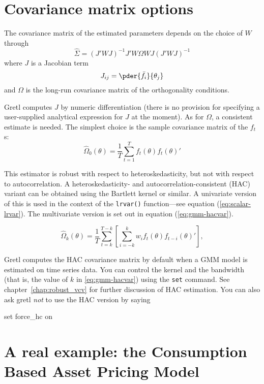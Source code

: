 \section{Covariance matrix options}
\label{sec:gmm-vcv}

The covariance matrix of the estimated parameters depends on the
choice of $W$ through
\begin{equation}
  \label{eq:gmmest-vcv}
    \hat{\Sigma} = (J'WJ)^{-1} J'W\Omega W J (J'WJ)^{-1}
\end{equation}
where $J$ is a Jacobian term
\[
  J_{ij} = \pder{\bar{f}_i}{\theta_j}
\]
and $\Omega$ is the long-run covariance matrix of the orthogonality
conditions. 

Gretl computes $J$ by numeric differentiation (there is no
provision for specifying a user-supplied analytical expression for $J$
at the moment). As for $\Omega$, a consistent estimate is needed. The
simplest choice is the sample covariance matrix of the $f_t$s:
\begin{equation}
  \label{eq:gmm-hcvar}
    \hat{\Omega}_0(\theta) = \frac{1}{T} \sum_{t=1}^T f_t(\theta) f_t(\theta)'
\end{equation}

This estimator is robust with respect to heteroskedasticity, but not
with respect to autocorrelation.  A heteroskedasticity- and
autocorrelation-consistent (HAC) variant can be obtained using the
Bartlett kernel or similar.  A univariate version of this is used in
the context of the \texttt{lrvar()} function---see equation
(\ref{eq:scalar-lrvar}).  The multivariate version is set out in
equation (\ref{eq:gmm-hacvar}).

\begin{equation}
  \label{eq:gmm-hacvar}
    \hat{\Omega}_k(\theta) = \frac{1}{T} 
    \sum_{t=k}^{T-k} \left[ \sum_{i=-k}^k w_i f_t(\theta) f_{t-i}(\theta)'  \right] ,
\end{equation}

Gretl computes the HAC covariance matrix by default when a GMM
model is estimated on time series data.  You can control the kernel
and the bandwidth (that is, the value of $k$ in \ref{eq:gmm-hacvar})
using the \texttt{set} command.  See chapter~\ref{chap:robust_vcv} for
further discussion of HAC estimation.  You can also ask gretl
\emph{not} to use the HAC version by saying
%
\begin{code}
set force_hc on
\end{code}

\section{A real example: the Consumption Based Asset Pricing Model}
\label{sec:gmm-CBAPM}

